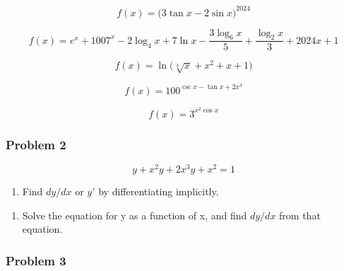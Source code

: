 \documentclass[
  letterpaper,
  DIV=11,
  numbers=noendperiod]{scrartcl}
\providecommand{\tightlist}{%
  \setlength{\itemsep}{0pt}\setlength{\parskip}{0pt}}\usepackage{longtable,booktabs,array}
\begin{document}
\hfill\break
\hfill\break
\hfill\break
\hfill\break
\hfill\break

\[f(x) = \bigg(3\tan x - 2\sin x\bigg)^{2024}\]

\hfill\break
\hfill\break
\hfill\break
\hfill\break
\hfill\break

\[f(x) = e^x +1007^x - 2\log_{4}x + 7\ln x - \frac{3\log_6 x}{5} + \frac{\log_2 x}{3} + 2024x + 1\]

\hfill\break
\hfill\break
\hfill\break
\hfill\break
\hfill\break

\[f(x) = \ln\bigg(\sqrt[3]{x}+x^2+x+1\bigg)\]

\hfill\break
\hfill\break
\hfill\break
\hfill\break
\hfill\break

\[f(x) = 100^{\csc x - \tan x + 2x^3}\]

\hfill\break
\hfill\break
\hfill\break
\hfill\break
\hfill\break

\[f(x) = 3^{x^2\cos x}\]

\hfill\break
\hfill\break
\hfill\break
\hfill\break
\hfill\break

\subsubsection{Problem 2}\label{problem-2}

\[
y + x^2y + 2x^3y + x^2 = 1
\]

\begin{enumerate}
\def\labelenumi{(\alph{enumi})}
\tightlist
\item
  Find \(dy/dx\) or \(y'\) by differentiating implicitly.
\end{enumerate}

\hfill\break
\hfill\break
\hfill\break
\hfill\break
\hfill\break
\hfill\break
\hfill\break
\hfill\break
\hfill\break
\hfill\break

\begin{enumerate}
\def\labelenumi{(\alph{enumi})}
\setcounter{enumi}{1}
\tightlist
\item
  Solve the equation for y as a function of x, and find \(dy/dx\) from
  that equation.
\end{enumerate}

\hfill\break
\hfill\break
\hfill\break
\hfill\break
\hfill\break
\hfill\break
\hfill\break
\hfill\break
\hfill\break
\hfill\break

\subsubsection{Problem 3}\label{problem-3}
\end{document}
